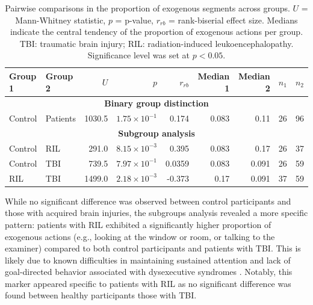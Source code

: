 \begin{chapterabstract}
        \begin{table}[h!]
            \centering
            \label{tab:task_exo_results}
            \begin{tabular}{l l r r r r r r r}
            \hline
            Group 1 & Group 2 & $U$ & $p$ & $r_{rb}$ & Median 1 & Median 2 & $n_1$ & $n_2$ \\
            \hline
            \multicolumn{9}{c}{\textbf{Binary group distinction}} \\
            \hline
            Control & Patients & 1030.5 & $1.75 \times 10^{-1}$ &  0.174 & 0.083 & 0.11 & 26 & 96 \\
            \hline
            \multicolumn{9}{c}{\textbf{Subgroup analysis}} \\
            \hline
            Control & RIL & 291.0  & $8.15 \times 10^{-3}$ &  0.395 & 0.083 & 0.17 & 26 & 37 \\
            Control & TBI & 739.5  & $7.97 \times 10^{-1}$ &  0.0359 & 0.083 & 0.091 & 26 & 59 \\
            RIL     & TBI & 1499.0 & $2.18 \times 10^{-3}$ & -0.373 & 0.17  & 0.091 & 37 & 59 \\
            \hline
            \end{tabular}
            \caption{Pairwise comparisons in the proportion of exogenous segments across groups. $U$ = Mann-Whitney statistic, $p$ = p-value, $r_{rb}$ = rank-biserial effect size. Medians indicate the central tendency of the proportion of exogenous actions per group. TBI: traumatic brain injury; RIL: radiation-induced leukoencephalopathy. Significance level was set at $p<0.05$.}
        \end{table}

        While no significant difference was observed between control participants and those with acquired brain injuries, the subgroups analysis revealed a more specific pattern: patients with RIL exhibited a significantly higher proportion of exogenous actions (e.g., looking at the window or room, or talking to the examiner) compared to both control participants and patients with TBI. This is likely due to known difficulties in maintaining sustained attention and lack of goal-directed behavior associated with dysexecutive syndromes \cite{Hendry2016sh}. Notably, this marker appeared specific to patients with RIL as no significant difference was found between healthy participants those with TBI.  %


\end{chapterabstract}
